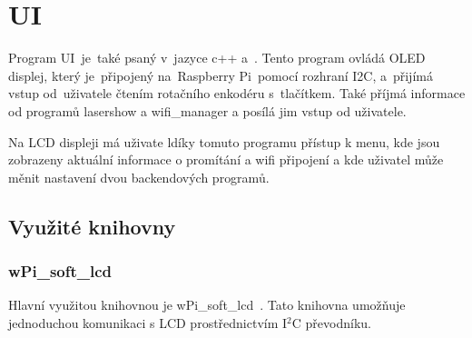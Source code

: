 \section{UI}
Program UI~je~také psaný v~jazyce c++ a~. Tento program ovládá OLED displej, který je~připojený na~Raspberry Pi~pomocí rozhraní I2C, a~přijímá vstup od~uživatele čtením rotačního enkodéru s~tlačítkem. Také příjmá informace od programů lasershow a wifi\_manager a posílá jim vstup od uživatele.

Na LCD displeji má uživate ldíky tomuto programu přístup k menu, kde jsou zobrazeny aktuální informace o promítání a wifi připojení a kde uživatel může měnit nastavení dvou backendových programů.

\subsection{Využité knihovny}
\subsubsection{wPi\_soft\_lcd}
Hlavní využitou knihovnou je wPi\_soft\_lcd~\cite{wpi-lcd}. Tato knihovna umožňuje jednoduchou komunikaci s LCD prostřednictvím I$^{2}$C převodníku. 

